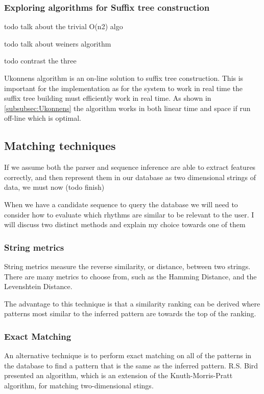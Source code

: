 \documentclass[12pt,twoside,notitlepage]{report}
\begin{document}
			\subsubsection{Exploring algorithms for Suffix tree construction}
			todo talk about the trivial O(n2) algo
			
			todo talk about weiners algorithm

			todo contrast the three

			Ukonnens algorithm\cite{Ukkonen1995} is an on-line solution to suffix tree construction. This is important for the implementation as for the system to work in real time the suffix tree building must efficiently work in real time. As shown in \ref{subsubsec:Ukonnens} the algorithm works in both linear time and space if run off-line which is optimal.
		\subsection{Matching techniques}

		If we assume both the parser and sequence inference are able to extract features correctly, and then represent them in our database as two dimensional strings of data, we must now 	(todo finish)	
		
		When we have a candidate sequence to query the database we will need to consider how to evaluate which rhythms are similar to be relevant to the user. I will discuss two distinct methods and explain my choice towards one of them 
			\subsubsection{String metrics}
			String metrics measure the reverse similarity, or distance, between two strings. There are many metrics to choose from, such as the Hamming Distance\cite{Hamming1950}, and the Levenshtein Distance\cite{Levenshtein1966}.
			
			The advantage to this technique is that a similarity ranking can be derived where patterns most similar to the inferred pattern are towards the top of the ranking.
			\subsubsection{Exact Matching}
			An alternative technique is to perform exact matching on all of the patterns in the database to find a pattern that is the same as the inferred pattern. R.S. Bird presented an algorithm\cite{Bird1977}, which is an extension of the Knuth-Morris-Pratt algorithm\cite{KnuthMorrisPratt1974}, for matching two-dimensional stings.
			
\end{document}
